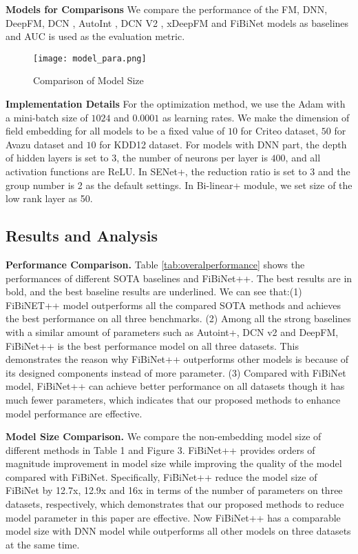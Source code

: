 \documentclass[sigconf]{acmart}
\begin{document}
\textbf{Models for Comparisons}
We compare the performance of the FM\cite{rendle2010factorization}, DNN, DeepFM\cite{guo2017deepfm}, DCN \cite{wang2017deep}, AutoInt \cite{song2019autoint}, DCN V2 \cite{WangSCJLHC21}, xDeepFM \cite{lian2018xdeepfm} and FiBiNet \cite{HuangZZ19} models as baselines and AUC is used as the evaluation metric.
\begin{figure}[h]
  \centering
  \texttt{[image: model\_para.png]}
  \caption{Comparison of Model Size}
\end{figure}

\textbf{Implementation Details}
For the optimization method, we use the Adam with a mini-batch size of $1024$ and $0.0001$ as learning rates. We make the dimension of field embedding for all models to be a fixed value of $10$ for Criteo dataset,  $50$ for Avazu dataset and $10$ for KDD12 dataset.  For models with DNN part, the depth of hidden layers is set to $3$, the number of neurons per layer is $400$, and all activation functions are ReLU. In SENet+, the reduction ratio is set to 3 and the group number is 2 as the default settings. In Bi-linear+ module, we set size of the low rank layer as 50. 

\subsection{Results and Analysis}
\textbf{Performance Comparison.}  Table \ref{tab:overalperformance} shows the performances of different SOTA baselines and FiBiNet++.  The best results are in bold, and the best baseline results are underlined. We can see that:(1) FiBiNET++ model outperforms all the compared SOTA methods and achieves the best performance on all three benchmarks. (2) Among all the strong baselines with a similar amount of parameters such as Autoint+, DCN v2 and DeepFM, FiBiNet++ is the best performance model on all three datasets. This demonstrates the reason why FiBiNet++ outperforms other models is because of its designed components instead of more parameter. (3) Compared with FiBiNet model, FiBiNet++ can achieve better performance on all datasets though it has much fewer parameters, which indicates that our proposed methods to enhance model performance are effective.


\textbf{Model Size Comparison.} We compare the non-embedding model size of different methods in Table 1 and Figure 3. FiBiNet++ provides orders of magnitude improvement in model size while improving the quality of the model compared with FiBiNet. Specifically, FiBiNet++ reduce the model size of FiBiNet by 12.7x, 12.9x and 16x in terms of the number of parameters on three datasets, respectively, which demonstrates that our proposed methods to reduce model parameter in this paper are effective. Now FiBiNet++ has a comparable model size with DNN model while outperforms all other models on three datasets at the same time. 
\end{document}
